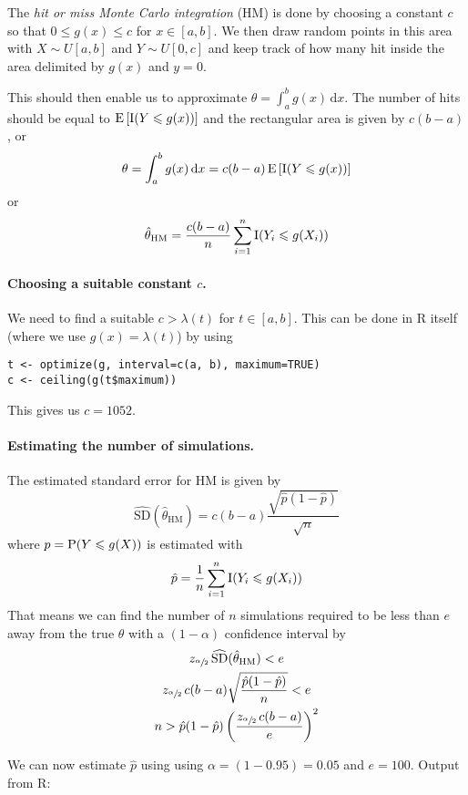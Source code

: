 \documentclass[a4paper,english,12pt]{article}
\begin{document}
The \textit{hit or miss Monte Carlo integration} (HM) is done by choosing a
constant $c$ so that $0 \leqslant g(x) \leqslant c$ for $x \in [a,b]$. We then
draw random points in this area with $X \sim U[a, b]$ and $Y \sim U[0, c]$ and
keep track of how many hit inside the area delimited by
$g(x)$ and $y=0$.

This should then enable us to approximate $\theta = \int_a^b
g(x)\, \textrm{d}x$. The number of hits should be equal to
$\mathrm{E}\left[ \mathrm{I}(Y \leqslant g(x)) \right]$ and the rectangular area is given by
$c(b-a)$, or
\[
  \theta = \int_a^b g(x)\, \textrm{d}x
    = c(b-a)\, \mathrm{E}\left[ \mathrm{I}(Y \leqslant g(x)) \right]
\]
or
\[
  \hat{\theta}_{\textrm{HM}} =
    \frac{c(b-a)}{n} \sum_{i=1}^n \mathrm{I}(Y_i \leqslant g(X_i))
\]

\paragraph{Choosing a suitable constant $c$.}
We need to find a suitable $c > \lambda(t)$ for $t \in [a, b]$. This can be
done in R itself (where we use $g(x) = \lambda(t)$) by using
\begin{Verbatim}
t <- optimize(g, interval=c(a, b), maximum=TRUE)
c <- ceiling(g(t$maximum))
\end{Verbatim}
This gives us $c = 1052$.

\paragraph{Estimating the number of simulations.}
The estimated standard error for HM is given by
\[
  \widehat{\textrm{SD}}(\hat{\theta}_{\textrm{HM}})
    = c(b-a) \frac{ \sqrt{\hat{p}(1-\hat{p})}  }{\sqrt{n}}
\]
where $p = \mathrm{P}(Y \leqslant g(X))$ is estimated with
\[
  \hat{p} = \frac{1}{n} \sum_{i=1}^{n} \mathrm{I}( Y_i \leqslant g(X_i) )
\]
That means we can find the number of $n$ simulations required to be less than
$e$ away from the true $\theta$ with a $(1-\alpha)$ confidence interval by
\begin{gather*}
  z_{\sfrac{\alpha}{2}}\, \widehat{\textrm{SD}}(\hat{\theta}_{\textrm{HM}}) < e \\
  z_{\sfrac{\alpha}{2}}\, c(b-a) \sqrt{ \frac{\hat{p}(1-\hat{p})}{n} } < e \\
  n > \hat{p} (1 - \hat{p})
          \left( \frac{ z_{\sfrac{\alpha}{2}}\, c(b - a) }{ e } \right)^2
\end{gather*}

We can now estimate $\hat{p}$ using using $\alpha = (1-0.95) = 0.05$ and $e =
100$. Output from R:
\end{document}
